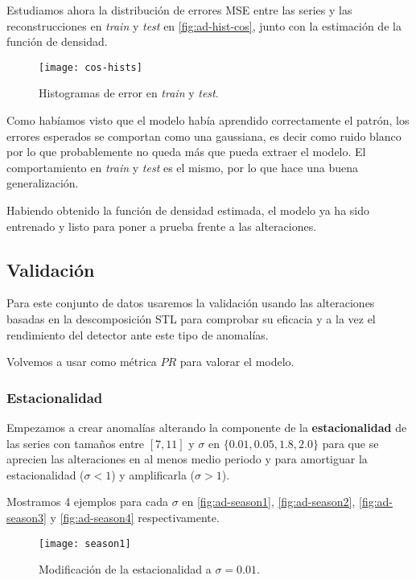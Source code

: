Estudiamos ahora la distribución de errores MSE entre las series y las reconstrucciones en \emph{train} y \emph{test} en \autoref{fig:ad-hist-cos}, junto con la estimación de la función de densidad.

\begin{figure}[htpb]
  \centering
  \texttt{[image: cos-hists]}
  \caption{Histogramas de error en \emph{train} y \emph{test}.}
  \label{fig:ad-hist-cos}
\end{figure}

Como habíamos visto que el modelo había aprendido correctamente el patrón, los errores esperados se comportan como una gaussiana, es decir como ruido blanco por lo que probablemente no queda más que pueda extraer el modelo. El comportamiento en \emph{train} y \emph{test} es el mismo, por lo que hace una buena generalización.

Habiendo obtenido la función de densidad estimada, el modelo ya ha sido entrenado y listo para poner a prueba frente a las alteraciones.

\subsection{Validación}

Para este conjunto de datos usaremos la validación usando las alteraciones basadas en la descomposición STL para comprobar su eficacia y a la vez el rendimiento del detector ante este tipo de anomalías.

Volvemos a usar como métrica $PR$ para valorar el modelo.

\subsubsection{Estacionalidad}

Empezamos a crear anomalías alterando la componente de la \textbf{estacionalidad} de las series con tamaños entre $[7, 11]$ y $\sigma$ en $\{0.01, 0.05, 1.8, 2.0\}$ para que se aprecien las alteraciones en al menos medio periodo y para amortiguar la estacionalidad ($\sigma < 1$) y amplificarla ($\sigma > 1$).

Mostramos 4 ejemplos para cada $\sigma$ en \autoref{fig:ad-season1}, \autoref{fig:ad-season2}, \autoref{fig:ad-season3} y \autoref{fig:ad-season4} respectivamente.

\begin{figure}[htpb]
  \centering
  \texttt{[image: season1]}
  \caption{Modificación de la estacionalidad a $\sigma = 0.01$.}
  \label{fig:ad-season1}
\end{figure}


